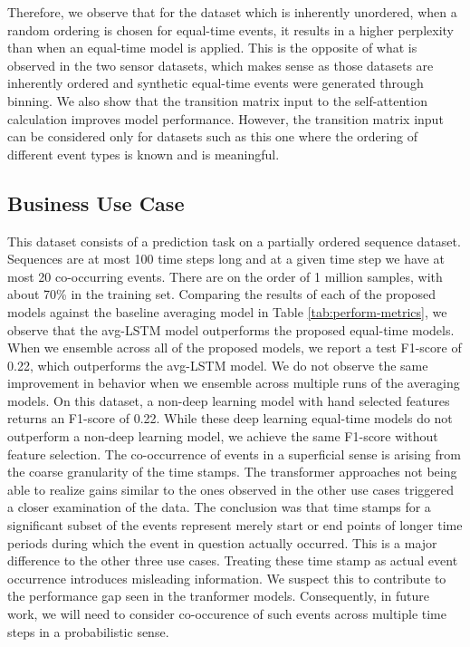 \documentclass[reqno ,11pt]{article}
\begin{document}
Therefore, we observe that for the dataset which is inherently unordered, when a random ordering is chosen for equal-time events, it results in a higher perplexity than when an equal-time model is applied. This is the opposite of what is observed in the two sensor datasets, which makes sense as those datasets are inherently ordered and synthetic equal-time events were generated through binning. We also show that the transition matrix input to the self-attention calculation improves model performance. However, the transition matrix input can be considered only for datasets such as this one where the ordering of different event types is known and is meaningful. 

\subsection{Business Use Case} 

This dataset consists of a prediction task on a partially ordered sequence dataset. Sequences are at most 100 time steps long and at a given time step we have at most 20 co-occurring events. There are on the order of 1 million samples, with about 70\% in the training set. Comparing the results of each of the proposed models against the baseline averaging model in Table \ref{tab:perform-metrics}, we observe that the avg-LSTM model outperforms the proposed equal-time models. When we ensemble across all of the proposed models, we report a test F1-score of 0.22, which outperforms the avg-LSTM model. We do not observe the same improvement in behavior when we ensemble across multiple runs of the averaging models. On this dataset, a non-deep learning model with hand selected features returns an F1-score of 0.22. While these deep learning equal-time models do not outperform a non-deep learning model, we achieve the same F1-score without feature selection. 
The co-occurrence of events in a superficial sense is arising from the coarse granularity of the time stamps. The transformer approaches not being able to realize gains similar to the ones observed in the other use cases triggered a closer examination of the data. The conclusion was that time stamps for a significant subset of the events represent merely start or end points of longer time periods during which the event in question actually occurred. This is a major difference to the other three use cases. Treating these time stamp as actual event occurrence introduces misleading information. We suspect this to contribute to the performance gap seen in the tranformer models.
Consequently, in future work, we will need to consider co-occurence of such events across multiple time steps in a probabilistic sense. 
\end{document}
